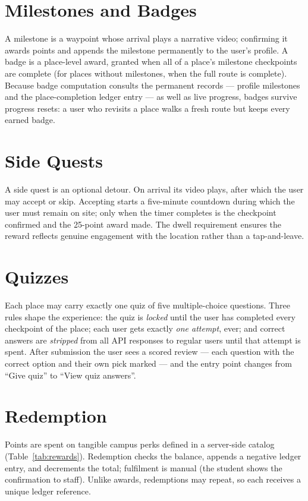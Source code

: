 \section{Milestones and Badges}
A milestone is a waypoint whose arrival plays a narrative video; confirming
it awards points and appends the milestone permanently to the user's
profile. A badge is a place-level award, granted when all of a place's
milestone checkpoints are complete (for places without milestones, when the
full route is complete). Because badge computation consults the permanent
records --- profile milestones and the place-completion ledger entry --- as
well as live progress, badges survive progress resets: a user who revisits
a place walks a fresh route but keeps every earned badge.

\section{Side Quests}
A side quest is an optional detour. On arrival its video plays, after which
the user may accept or skip. Accepting starts a five-minute countdown during
which the user must remain on site; only when the timer completes is the
checkpoint confirmed and the 25-point award made. The dwell requirement
ensures the reward reflects genuine engagement with the location rather
than a tap-and-leave.

\section{Quizzes}
Each place may carry exactly one quiz of five multiple-choice questions.
Three rules shape the experience: the quiz is \emph{locked} until the user
has completed every checkpoint of the place; each user gets exactly
\emph{one attempt}, ever; and correct answers are \emph{stripped} from all
API responses to regular users until that attempt is spent. After
submission the user sees a scored review --- each question with the correct
option and their own pick marked --- and the entry point changes from
``Give quiz'' to ``View quiz answers''.

\section{Redemption}
Points are spent on tangible campus perks defined in a server-side catalog
(Table~\ref{tab:rewards}). Redemption checks the balance, appends a
negative ledger entry, and decrements the total; fulfilment is manual (the
student shows the confirmation to staff). Unlike awards, redemptions may
repeat, so each receives a unique ledger reference.

